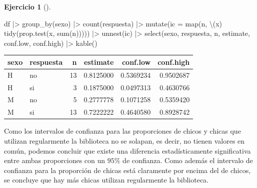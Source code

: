 \documentclass[
  a4paper,
]{scrreport}
\newenvironment{Shaded}{\begin{snugshade}}{\end{snugshade}}
\newcommand{\AttributeTok}[1]{\textcolor[rgb]{0.40,0.45,0.13}{#1}}
\newcommand{\FunctionTok}[1]{\textcolor[rgb]{0.28,0.35,0.67}{#1}}
\newcommand{\NormalTok}[1]{\textcolor[rgb]{0.00,0.23,0.31}{#1}}
\newcommand{\SpecialCharTok}[1]{\textcolor[rgb]{0.37,0.37,0.37}{#1}}
\theoremstyle{definition}
\newtheorem{exercise}{Ejercicio}[chapter]
\theoremstyle{remark}
\begin{document}
\begin{exercise}[]
\begin{enumerate}
  \begin{tcolorbox}[enhanced jigsaw, toprule=.15mm, rightrule=.15mm, arc=.35mm, colback=white, colbacktitle=quarto-callout-tip-color!10!white, toptitle=1mm, left=2mm, colframe=quarto-callout-tip-color-frame, opacityback=0, breakable, opacitybacktitle=0.6, bottomtitle=1mm, titlerule=0mm, title=\textcolor{quarto-callout-tip-color}{\faLightbulb}\hspace{0.5em}{Solución}, bottomrule=.15mm, coltitle=black, leftrule=.75mm]

\begin{Shaded}
\begin{Highlighting}[]
\NormalTok{df }\SpecialCharTok{|\textgreater{}} 
    \FunctionTok{group\_by}\NormalTok{(sexo) }\SpecialCharTok{|\textgreater{}} 
    \FunctionTok{count}\NormalTok{(respuesta) }\SpecialCharTok{|\textgreater{}} 
    \FunctionTok{mutate}\NormalTok{(}\AttributeTok{ic =} \FunctionTok{map}\NormalTok{(n, \textbackslash{}(x) }\FunctionTok{tidy}\NormalTok{(}\FunctionTok{prop.test}\NormalTok{(x, }\FunctionTok{sum}\NormalTok{(n))))) }\SpecialCharTok{|\textgreater{}}     
    \FunctionTok{unnest}\NormalTok{(ic) }\SpecialCharTok{|\textgreater{}}
    \FunctionTok{select}\NormalTok{(sexo, respuesta, n, estimate, conf.low, conf.high) }\SpecialCharTok{|\textgreater{}}  
    \FunctionTok{kable}\NormalTok{() }
\end{Highlighting}
\end{Shaded}

  \begin{tabular}{l|l|r|r|r|r}
  \hline
  sexo & respuesta & n & estimate & conf.low & conf.high\\
  \hline
  H & no & 13 & 0.8125000 & 0.5369234 & 0.9502687\\
  \hline
  H & si & 3 & 0.1875000 & 0.0497313 & 0.4630766\\
  \hline
  M & no & 5 & 0.2777778 & 0.1071258 & 0.5359420\\
  \hline
  M & si & 13 & 0.7222222 & 0.4640580 & 0.8928742\\
  \hline
  \end{tabular}

  Como los intervalos de confianza para las proporciones de chicos y
  chicas que utilizan regularmente la biblioteca no se solapan, es
  decir, no tienen valores en común, podemos concluir que existe una
  diferencia estadísticamente significativa entre ambas proporciones con
  un \(95\%\) de confianza. Como además el intervalo de confianza para
  la proporción de chicas está claramente por encima del de chicos, se
  concluye que hay más chicas utilizan regularmente la biblioteca.

  \end{tcolorbox}
\end{enumerate}

\end{exercise}
\end{document}
